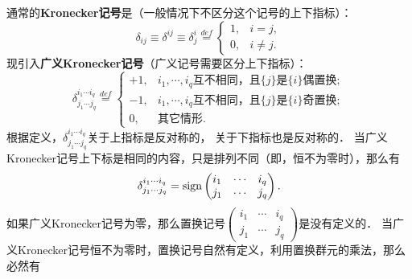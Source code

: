通常的{\bfseries Kronecker记号}是（一般情况下不区分这个记号的上下指标）：
\begin{equation}\label{chmla:eqn_ukd}
    \delta_{ij}\equiv \delta^{ij} \equiv \delta_{j}^{i} \overset{def}{=}
    \begin{cases}
        1, & i=j, \\
        0, & i\neq j.
    \end{cases}
\end{equation}
现引入{\bfseries 广义Kronecker记号}（广义记号需要区分上下指标）： 
\begin{equation}\label{chmla:eqn_gkd}
    \delta_{j_1 \cdots j_q}^{i_1 \cdots i_q} \overset{def}{=}
    \begin{cases}
        +1, & \text{$i_1,  \cdots, i_q$互不相同，且$\{ j\} $是$\{i\}$偶置换}; \\
        -1, & \text{$i_1,  \cdots, i_q$互不相同，且$\{ j\} $是$\{i\}$奇置换}; \\
        0,  & \text{其它情形}.
    \end{cases}
\end{equation}
根据定义，$\delta_{j_1 \cdots j_q}^{i_1 \cdots i_q}$关于上指标是反对称的，
关于下指标也是反对称的．
当广义Kronecker记号上下标是相同的内容，只是排列不同（即，恒不为零时），那么有
\begin{equation}\label{chmla:eqn_sign-p}
    \delta_{j_1 \cdots j_q}^{i_1 \cdots i_q} =
    {\rm sign}\begin{pmatrix}
        i_1 &\cdots &i_q \\ j_1 &\cdots &j_q
    \end{pmatrix} .
\end{equation}
如果广义Kronecker记号为零，那么置换记号$(\begin{smallmatrix}
    i_1 &\cdots &i_q \\ j_1 &\cdots &j_q \end{smallmatrix})$是没有定义的．
当广义Kronecker记号恒不为零时，置换记号自然有定义，利用置换群元的乘法，那么必然有
